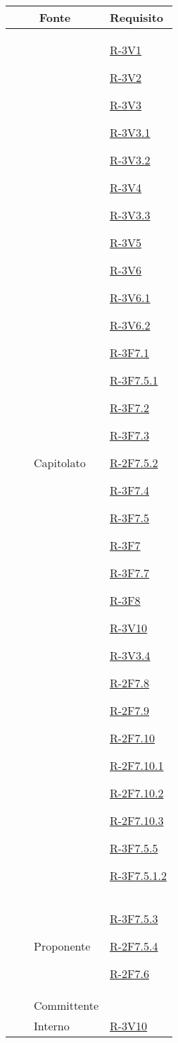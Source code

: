 \begin{longtable}{|r l p{5cm}|p{3cm}|}
	\hline
	\multicolumn{3}{|c|}{Fonte} & Requisito\tabularnewline
	\hline
	&  & Capitolato & \hyperlink{R-3V1}{R-3V1}
	
	\hyperlink{R-3V2}{R-3V2}
	
	\hyperlink{R-3V3}{R-3V3}
	
	\hyperlink{R-3V3.1}{R-3V3.1}
	
	\hyperlink{R-3V3.2}{R-3V3.2}
	
	\hyperlink{R-3V4}{R-3V4}
	
	\hyperlink{R-3V3.3}{R-3V3.3}
	
	\hyperlink{R-3V5}{R-3V5}
	
	\hyperlink{R-3V6}{R-3V6}
	
	\hyperlink{R-3V6.1}{R-3V6.1}
	
	\hyperlink{R-3V6.2}{R-3V6.2}
	
	\hyperlink{R-3F7.1}{R-3F7.1}
	
	\hyperlink{R-3F7.5.1}{R-3F7.5.1}
	
	\hyperlink{R-3F7.2}{R-3F7.2}
	
	\hyperlink{R-3F7.3}{R-3F7.3}
	
	\hyperlink{R-2F7.5.2}{R-2F7.5.2}
	
	\hyperlink{R-3F7.4}{R-3F7.4}
	
	\hyperlink{R-3F7.5}{R-3F7.5}
	
	\hyperlink{R-3F7}{R-3F7}
	
	\hyperlink{R-3F7.7}{R-3F7.7}
	
	\hyperlink{R-3F8}{R-3F8}
	
	\hyperlink{R-3V10}{R-3V10}
	
	\hyperlink{R-3V3.4}{R-3V3.4}
	
	\hyperlink{R-2F7.8}{R-2F7.8}
	
	\hyperlink{R-2F7.9}{R-2F7.9}
	
	\hyperlink{R-2F7.10}{R-2F7.10}
	
	\hyperlink{R-2F7.10.1}{R-2F7.10.1}
	
	\hyperlink{R-2F7.10.2}{R-2F7.10.2}
	
	\hyperlink{R-2F7.10.3}{R-2F7.10.3}
	
	\hyperlink{R-3F7.5.5}{R-3F7.5.5}
	
	\hyperlink{R-3F7.5.1.2}{R-3F7.5.1.2}\tabularnewline
	\hline
	&  & Proponente & \hyperlink{R-3F7.5.3}{R-3F7.5.3}
	
	\hyperlink{R-2F7.5.4}{R-2F7.5.4}
	
	\hyperlink{R-2F7.6}{R-2F7.6}\tabularnewline
	\hline
	&  & Committente & \tabularnewline
	\hline
	&  & Interno & \hyperlink{R-3V10}{R-3V10}
	

\end{longtable}
